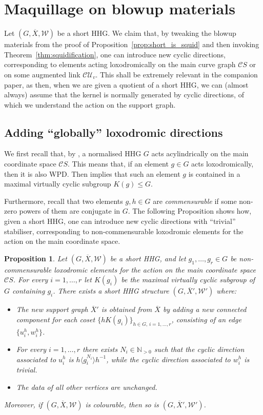 \documentclass[svgnames]{amsart}
\theoremstyle{plain}
\newtheorem{prop}[thm]{Proposition}
\theoremstyle{definition}
\newcommand{\C}{\mathcal C}
\newcommand{\ov}[1]{\overline{#1}}
\newcommand{\U}{\mathcal{U}}
\newcommand{\W}{\mathcal{W}}
\begin{document}
\section{Maquillage on blowup materials}\label{sec:maquillage}
Let $(G, \ov{X},\W)$ be a short HHG. We claim that, by tweaking the blowup materials from the proof of Proposition~\ref{prop:short_is_squid} and then invoking Theorem~\ref{thm:squidification}, one can introduce new cyclic directions, corresponding to elements acting loxodromically on the main curve graph $\C S$ or on some augmented link $\C \U_v$. This shall be extremely relevant in the companion paper, as then, when we are given a quotient of a short HHG, we can (almost always) assume that the kernel is normally generated by cyclic directions, of which we understand the action on the support graph.




\subsection{Adding ``globally'' loxodromic directions}
We first recall that, by \cite[Corollary 14.4]{HHS_I}, a normalised HHG $G$ acts acylindrically on the main coordinate space $\C S$. This means that, if an element $g\in G$ acts loxodromically, then it is also WPD. Then \cite[Lemma 6.5]{DGO} implies that such an element $g$ is contained in a maximal virtually cyclic subgroup $K(g)\le G$.

Furthermore, recall that two elements $g,h\in G$ are \emph{commensurable} if some non-zero powers of them are conjugate in $G$. The following Proposition shows how, given a short HHG, one can introduce new cyclic directions with “trivial” stabiliser, corresponding to non-commensurable loxodromic elements for the action on the main coordinate space.



\begin{prop}\label{prop:add_loxo}
    Let $(G, \ov{X},\W)$ be a short HHG, and let $g_1,\ldots, g_r\in G$ be non-commensurable loxodromic elements for the action on the main coordinate space $\C S$. For every $i=1,\ldots,r$ let $K(g_i)$ be the maximal virtually cyclic subgroup of $G$ containing $g_i$. There exists a short HHG structure $(G, \ov X',\W')$ where:
    \begin{itemize}
        \item The new support graph $\ov{X}'$ is obtained from $\ov{X}$ by adding a new connected component for each coset $\{hK(g_i)\}_{h\in G,\,i=1,\ldots, r}$, consisting of an edge $\{u^h_i, w^h_i\}$.
        \item For every $i=1,\ldots, r$ there exists $N_i\in\mathbb{N}_{>0}$ such that the cyclic direction associated to $u^h_i$ is $h\langle g_i^{N_i}\rangle h^{-1}$, while the cyclic direction associated to $w^h_i$ is trivial.
        \item The data of all other vertices are unchanged. 
    \end{itemize}
    Moreover, if $(G, \ov{X},\W)$ is colourable, then so is $(G, \ov X',\W')$.
\end{prop}
\end{document}
